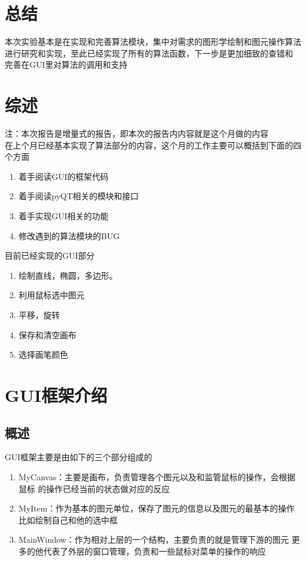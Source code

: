 \documentclass[a4paper,UTF8]{article}
\theoremstyle{definition}
\begin{document}
\section{总结}
本次实验基本是在实现和完善算法模块，集中对需求的图形学绘制和图元操作算法
进行研究和实现，至此已经实现了所有的算法函数，下一步是更加细致的查错和
完善在GUI里对算法的调用和支持



\section{综述}
注：本次报告是增量式的报告，即本次的报告内内容就是这个月做的内容\\
在上个月已经基本实现了算法部分的内容，这个月的工作主要可以概括到下面的四个方面
\begin{enumerate}
    \item 着手阅读GUI的框架代码
    
    \item 着手阅读pyQT相关的模块和接口
    
    \item 着手实现GUI相关的功能
    
    \item 修改遇到的算法模块的BUG
\end{enumerate}

目前已经实现的GUI部分
\begin{enumerate}
    \item 绘制直线，椭圆，多边形。
    
    \item 利用鼠标选中图元
    
    \item 平移，旋转
    
    \item 保存和清空画布
    
    \item 选择画笔颜色
\end{enumerate}
\section{GUI框架介绍}
\subsection{概述}
GUI框架主要是由如下的三个部分组成的

\begin{enumerate}
    \item MyCanvas：主要是画布，负责管理各个图元以及和监管鼠标的操作，会根据鼠标
    的操作已经当前的状态做对应的反应
    
    \item MyItem：作为基本的图元单位，保存了图元的信息以及图元的最基本的操作
    比如绘制自己和他的选中框
    
    \item MainWindow：作为相对上层的一个结构，主要负责的就是管理下游的图元
    更多的他代表了外层的窗口管理，负责和一些鼠标对菜单的操作的响应
\end{enumerate}
\end{document}
